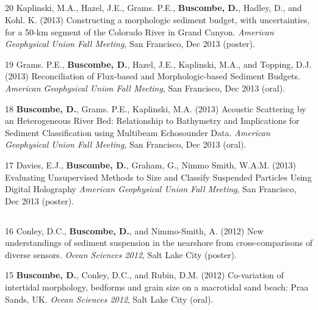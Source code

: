 \documentclass[margin,line]{resume}
\begin{document}
\begin{resume}
\begin{footnotesize}
	\subsection{}
	\begin{list1}
	\item[20] Kaplinski, M.A., Hazel, J.E., Grams. P.E., {\bf Buscombe, D.}, Hadley, D., and Kohl. K. (2013) Constructing a morphologic sediment budget, with uncertainties, for a 50-km segment of the Colorado River in Grand Canyon.  {\sl American Geophysical Union Fall Meeting}, San Francisco, Dec 2013 (poster).\\

	\item[19] Grams. P.E., {\bf Buscombe, D.}, Hazel, J.E., Kaplinski, M.A., and Topping, D.J. (2013) Reconciliation of Flux-based and Morphologic-based Sediment Budgets. {\sl American Geophysical Union Fall Meeting}, San Francisco, Dec 2013 (oral). \\

	\item[18] {\bf Buscombe, D.}, Grams. P.E., Kaplinski, M.A. (2013) Acoustic Scattering by an Heterogeneous River Bed: Relationship to Bathymetry and Implications for Sediment Classification using Multibeam Echosounder Data. {\sl American Geophysical Union Fall Meeting}, San Francisco, Dec 2013 (oral). \\

	\item[17] Davies, E.J., {\bf Buscombe, D.}, Graham, G., Nimmo Smith, W.A.M. (2013) Evaluating Unsupervised Methods to Size and Classify Suspended Particles Using Digital Holography {\sl American Geophysical Union Fall Meeting}, San Francisco, Dec 2013 (poster). 
	\end{list1}

	\subsection{}
	\begin{list1}
        \item[16] Conley, D.C., {\bf Buscombe, D.}, and Nimmo-Smith, A. (2012) New understandings of sediment suspension in the nearshore from cross-comparisons of diverse  sensors. {\sl Ocean Sciences 2012}, Salt Lake City (poster).\\

	\item[15] {\bf Buscombe, D.}, Conley, D.C., and Rubin, D.M. (2012) Co-variation of intertidal morphology, bedforms and grain size on a macrotidal sand beach: Praa Sands, UK. {\sl Ocean Sciences 2012}, Salt Lake City (oral).\\


\end{list1}
\end{footnotesize}
\end{resume}
\end{document}
